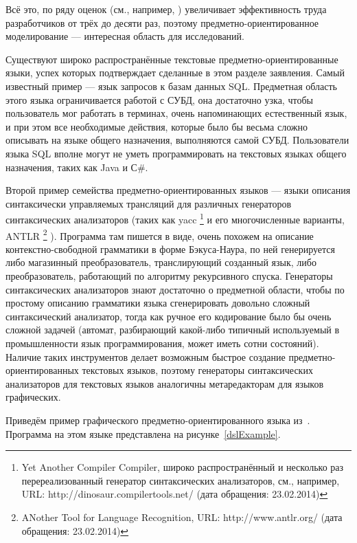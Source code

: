 Всё это, по ряду оценок (см., например, \cite{kieburtz1996software, kelly2000visual, gray2003examination})
увеличивает эффективность труда разработчиков от трёх до десяти раз, поэтому 
предметно-ориентированное моделирование --- интересная область для исследований.

Существуют широко распространённые текстовые предметно-ориентированные языки, 
успех которых подтверждает сделанные в этом разделе заявления. Самый известный 
пример --- язык запросов к базам данных SQL. Предметная область этого языка 
ограничивается работой с СУБД, она достаточно узка, чтобы пользователь мог 
работать в терминах, очень напоминающих естественный язык, и при этом все 
необходимые действия, которые было бы весьма сложно описывать на языке общего 
назначения, выполняются самой СУБД. Пользователи языка SQL вполне могут не уметь 
программировать на текстовых языках общего назначения, таких как Java и С\#. 

Второй пример семейства предметно-ориентированных языков --- языки описания 
синтаксически управляемых трансляций для различных генераторов синтаксических 
анализаторов (таких как yacc%
\footnote{Yet Another Compiler Compiler, широко распространённый и несколько раз перереализованный генератор 
синтаксических анализаторов, см., например, URL: http://dinosaur.compilertools.net/ (дата обращения: 23.02.2014)}
 и его многочисленные варианты, ANTLR%
\footnote{ANother Tool for Language Recognition, URL: http://www.antlr.org/ (дата обращения: 23.02.2014)}%
). Программа там пишется в виде, очень похожем на описание контекстно-свободной 
грамматики в форме Бэкуса-Наура, по ней генерируется либо магазинный 
преобразователь, транслирующий созданный язык, либо преобразователь, работающий 
по алгоритму рекурсивного спуска. Генераторы синтаксических анализаторов знают 
достаточно о предметной области, чтобы по простому описанию грамматики языка 
сгенерировать довольно сложный синтаксический анализатор, тогда как ручное его 
кодирование было бы очень сложной задачей (автомат, разбирающий какой-либо 
типичный используемый в промышленности язык программирования, может иметь сотни 
состояний). Наличие таких инструментов делает возможным быстрое создание 
предметно-ориентированных текстовых языков, поэтому генераторы синтаксических 
анализаторов для текстовых языков аналогичны метаредакторам для языков 
графических.

Приведём пример графического предметно-ориентированного языка из~\cite{kelly2008domain}.
Программа на этом языке представлена на рисунке~\ref{dslExample}.

